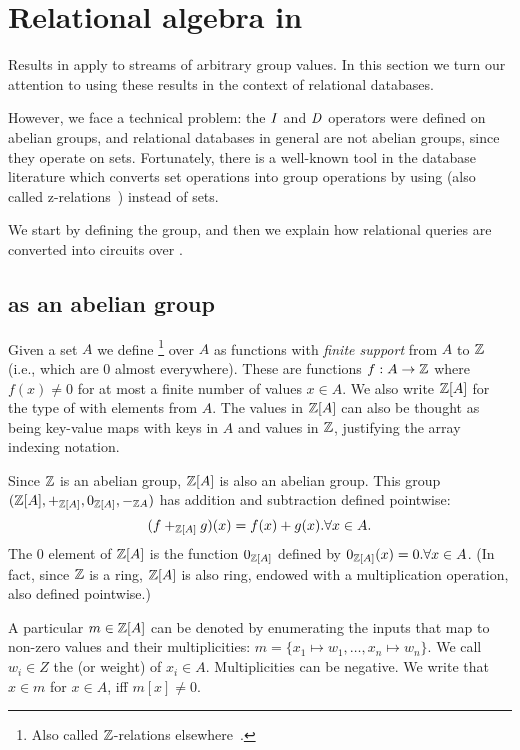 \section{Relational algebra in \dbsp}\label{sec:relational}

Results in  apply to streams of arbitrary group
values.  In this section we turn our attention to using these results
in the context of relational databases.

However, we face a technical problem: the $\mathit{I}$ and $\mathit{D}$ operators were
defined on abelian groups, and relational databases in general are
not abelian groups, since they operate on sets.  Fortunately,
there is a well-known tool in the database literature
which converts set operations into group operations by using \zrs
(also called z-relations~\cite{green-pods07}) instead of sets.

We start by defining the \zrs group, and then we explain how
relational queries are converted into \dbsp circuits over \zrs.

\subsection{\zrs as an abelian group}

Given a set $A$ we define \footnote{Also called $\mathbb{Z}$-relations elsewhere~\cite{green-tcs11}.}
over $A$ as functions with \emph{finite support} from $A$ to $\mathbb{Z}$ (i.e., which are 0 almost everywhere).
These are functions $f: A \rightarrow \mathbb{Z}$ where
$f(x) \not= 0$ for at most a finite number of values $x \in A$.
We also write $\mathbb{Z}[A]$ for the type of \zrs with elements from $A$.
The values in $\mathbb{Z}[A]$ can also be thought as being key-value maps with
keys in $A$ and values in $\mathbb{Z}$, justifying the array indexing notation.

Since $\mathbb{Z}$ is an abelian group, $\mathbb{Z}[A]$ is also an abelian group.  This group
$(\mathbb{Z}[A], +_{\mathbb{Z}[A]}, 0_{\mathbb{Z}[A]}, -_{\mathbb{Z}{A}})$ has addition and subtraction defined pointwise:
$$(f +_{\mathbb{Z}[A]} g)(x) = f(x) + g(x) . \forall x \in A.$$
The $0$ element of $\mathbb{Z}[A]$ is the function $0_{\mathbb{Z}[A]}$ defined by $0_{\mathbb{Z}[A]}(x) = 0 . \forall x \in A$.
(In fact, since $\mathbb{Z}$ is a ring, $\mathbb{Z}[A]$ is also ring, endowed with a multiplication operation,
also defined pointwise.)

A particular \zr $m \in \mathbb{Z}[A]$ can be denoted by enumerating the inputs that map to non-zero values and
their multiplicities:
$m = \{ x_1 \mapsto w_1, \dots, x_n \mapsto w_n \}$.
We call $w_i \in Z$ the  (or weight)
of $x_i \in A$.  Multiplicities can be negative.
We write that $x \in m$ for $x \in A$, iff $m[x] \not= 0$.

